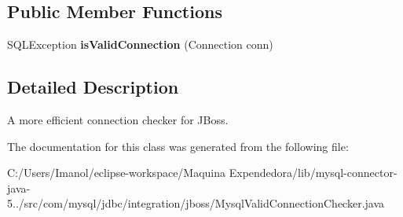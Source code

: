 \subsection*{Public Member Functions}
\begin{DoxyCompactItemize}
\item 
\mbox{\label{classcom_1_1mysql_1_1jdbc_1_1integration_1_1jboss_1_1_mysql_valid_connection_checker_a79ac198f22b23a765f46051cd6a4c993}} 
S\+Q\+L\+Exception {\bfseries is\+Valid\+Connection} (Connection conn)
\end{DoxyCompactItemize}


\subsection{Detailed Description}
A more efficient connection checker for J\+Boss. 

The documentation for this class was generated from the following file\+:\begin{DoxyCompactItemize}
\item 
C\+:/\+Users/\+Imanol/eclipse-\/workspace/\+Maquina Expendedora/lib/mysql-\/connector-\/java-\/5../src/com/mysql/jdbc/integration/jboss/Mysql\+Valid\+Connection\+Checker.\+java\end{DoxyCompactItemize}
